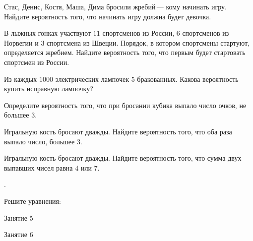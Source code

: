 \begin{class}[number=3]
\begin{listofex}
		\item Стас, Денис, Костя, Маша, Дима бросили жребий --- кому начинать игру. Найдите вероятность того, что начинать игру должна будет девочка.
		\item В лыжных гонках участвуют \( 11 \) спортсменов из России, \( 6 \) спортсменов из Норвегии и \( 3 \) спортсмена из Швеции. Порядок, в котором спортсмены стартуют, определяется жребием. Найдите вероятность того, что первым будет стартовать спортсмен из России.
		\item Из каждых \( 1000 \) электрических лампочек \( 5 \) бракованных. Какова вероятность купить исправную лампочку?
		\item Определите вероятность того, что при бросании кубика выпало число очков, не большее \( 3 \).
		\item Игральную кость бросают дважды. Найдите вероятность того, что оба раза выпало число, большее \( 3 \).
		\item Игральную кость бросают дважды. Найдите вероятность того, что сумма двух выпавших чисел равна \( 4 \) или \( 7 \).
	\end{listofex}
\end{class}

\begin{class}[number=4]
	\begin{listofex}
		\item .
	\end{listofex}
\end{class}

\begin{homework}[number=2]
	\begin{listofex}
		\item Решите уравнения:
	\end{listofex}
\end{homework}

\begin{class}[number=5]
	\begin{listofex}
		\item Занятие 5
	\end{listofex}
\end{class}

\begin{class}[number=6]
	\begin{listofex}
		\item Занятие 6
	\end{listofex}
\end{class}


